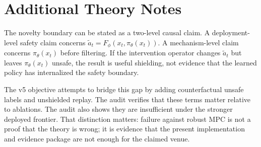 \documentclass{article}
\begin{document}
\citep{r1015612300000052,r101115detc201768280,r103390agronomy15010190,r101109tai20243351797,r101109tie20223148753} \citep{r101109lra20213076968,r10117709596518231153445,r101126sciroboticsabf1416,r101186s10033025012168,r101016jconengprac2024105901} \citep{r101109lra20243362643,r101109icra4663920229812048,r101109tmrb20233237924,r1011770278364920943266,r103390robotics14030026} \citep{r101109jiot20233264980,r101007s00146024021308,r101007s10994022061878,r103390s22239148,r103390su162310172} \citep{r101257pol20130025,r101109access20233253503,r1048550arxiv240306993,r101016jress2023109231,r101109lra20213063989} \citep{r101109ojemb20202987885,r1011453686811,r10117710778004251347509,r101016jenvsci2025104152,r103390bdcc8050049} \citep{r101007s00464022094871,r1023919ecc57647202310178263,r103390app13106001,r101109tits20213052786,r101186s1298401803542} \citep{r101115dscc20146048,r101108ir0420150065,r101016jfuture202012012,r1021595jme202423957,r101109access20172773127} \citep{r101109lcsys20253583748,r10114536765363698390,r10117702783649231221580,r101017cbp20244,r10100797830302542544} \citep{r101109icra57147202410611325,r101002rnc7109,r103389fnbot2022890695,r103390math13020235,r104236ica2020111002} \citep{r103390app13169173,r101126sciadvadp8407,r1010800883951420242379731,r101007s44168022000172,r101109iros4761220229981689} \citep{r103390machines10060489,r101109iros55552202310342181,r101109lra20182795639,r1018196jrcv6i627770,r101109tmech20162618362}

\section{Additional Theory Notes}
The novelty boundary can be stated as a two-level causal claim. A deployment-level safety claim concerns $\tilde a_t=F_\phi(x_t,\pi_\theta(x_t))$. A mechanism-level claim concerns $\pi_\theta(x_t)$ before filtering. If the intervention operator changes $\tilde a_t$ but leaves $\pi_\theta(x_t)$ unsafe, the result is useful shielding, not evidence that the learned policy has internalized the safety boundary.

The v5 objective attempts to bridge this gap by adding counterfactual unsafe labels and unshielded replay. The audit verifies that these terms matter relative to ablations. The audit also shows they are insufficient under the stronger deployed frontier. That distinction matters: failure against robust MPC is not a proof that the theory is wrong; it is evidence that the present implementation and evidence package are not enough for the claimed venue.
\end{document}
